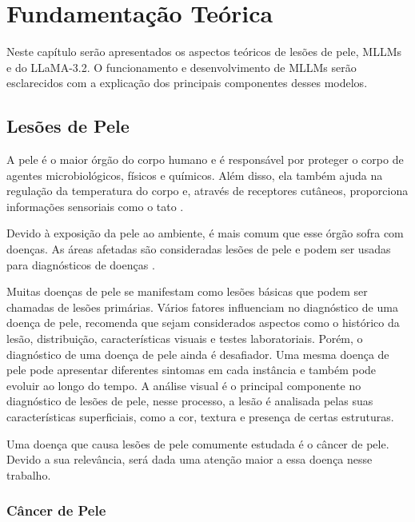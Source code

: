 
\chapter{Fundamentação Teórica}

Neste capítulo serão apresentados os aspectos teóricos de lesões de pele, \acp{MLLM} e do \ac{LLaMA}-3.2. O funcionamento e desenvolvimento de \acp{MLLM} serão
esclarecidos com a explicação dos principais componentes desses modelos.

\section{Lesões de Pele}

A pele é o maior órgão do corpo humano e é responsável por proteger o corpo de agentes microbiológicos, físicos e químicos. Além disso, ela também ajuda na regulação da
temperatura do corpo e, através de receptores cutâneos, proporciona informações sensoriais como o tato \cite{skin}.

Devido à exposição da pele ao ambiente, é mais comum que esse órgão sofra com doenças. As áreas afetadas são consideradas lesões de pele e podem ser usadas para
diagnósticos de doenças \cite{segmentation_skin_lesions}.

Muitas doenças de pele se manifestam como lesões básicas que podem ser chamadas de lesões primárias. Vários fatores influenciam no diagnóstico de uma doença de pele,
\textcite{habif2015clinical} recomenda que sejam considerados aspectos como o histórico da lesão, distribuição, características visuais e testes laboratoriais. Porém,
o diagnóstico de uma doença de pele ainda é desafiador. Uma mesma doença de pele pode apresentar diferentes sintomas em cada instância e também pode evoluir ao longo do
tempo. A análise visual é o principal componente no diagnóstico de lesões de pele, nesse processo, a lesão é analisada pelas suas características superficiais, como a
cor, textura e presença de certas estruturas.

Uma doença que causa lesões de pele comumente estudada é o câncer de pele. Devido a sua relevância, será dada uma atenção maior a essa doença nesse trabalho.

\subsection{Câncer de Pele}


